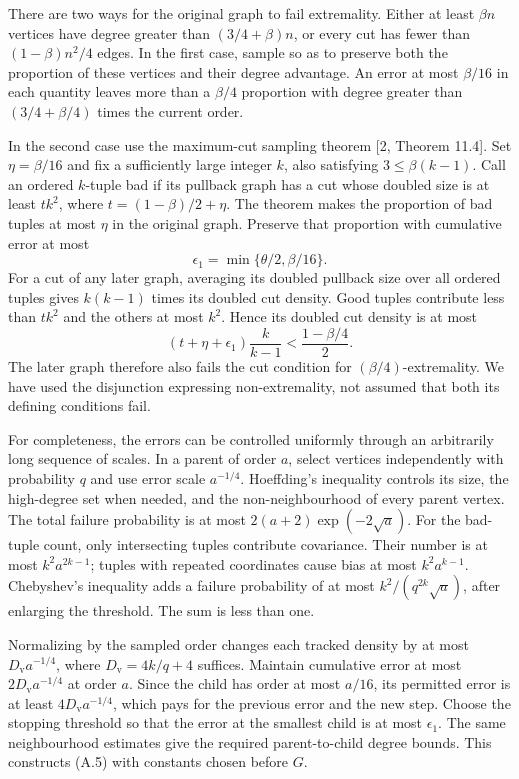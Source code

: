 \documentclass[english,11pt,a4paper]{article}
\begin{document}
There are two ways for the original graph to fail extremality. Either at least \(\beta n\) vertices have degree greater than \((3/4+\beta)n\), or every cut has fewer than \((1-\beta)n^2/4\) edges. In the first case, sample so as to preserve both the proportion of these vertices and their degree advantage. An error at most \(\beta/16\) in each quantity leaves more than a \(\beta/4\) proportion with degree greater than \((3/4+\beta/4)\) times the current order.

In the second case use the maximum-cut sampling theorem {[}2, Theorem 11.4{]}. Set \(\eta=\beta/16\) and fix a sufficiently large integer \(k\), also satisfying \(3\le\beta(k-1)\). Call an ordered \(k\)-tuple bad if its pullback graph has a cut whose doubled size is at least \(t k^2\), where \(t=(1-\beta)/2+\eta\). The theorem makes the proportion of bad tuples at most \(\eta\) in the original graph. Preserve that proportion with cumulative error at most \[\epsilon_1=\min\{\theta/2,\beta/16\}.\] For a cut of any later graph, averaging its doubled pullback size over all ordered tuples gives \(k(k-1)\) times its doubled cut density. Good tuples contribute less than \(t k^2\) and the others at most \(k^2\). Hence its doubled cut density is at most \[(t+\eta+\epsilon_1)\frac{k}{k-1}<\frac{1-\beta/4}{2}.\] The later graph therefore also fails the cut condition for \((\beta/4)\)-extremality. We have used the disjunction expressing non-extremality, not assumed that both its defining conditions fail.

For completeness, the errors can be controlled uniformly through an arbitrarily long sequence of scales. In a parent of order \(a\), select vertices independently with probability \(q\) and use error scale \(a^{-1/4}\). Hoeffding's inequality controls its size, the high-degree set when needed, and the non-neighbourhood of every parent vertex. The total failure probability is at most \(2(a+2)\exp(-2\sqrt a)\). For the bad-tuple count, only intersecting tuples contribute covariance. Their number is at most \(k^2a^{2k-1}\); tuples with repeated coordinates cause bias at most \(k^2a^{k-1}\). Chebyshev's inequality adds a failure probability of at most \(k^2/(q^{2k}\sqrt a)\), after enlarging the threshold. The sum is less than one.

Normalizing by the sampled order changes each tracked density by at most \(D_{\mathrm v}a^{-1/4}\), where \(D_{\mathrm v}=4k/q+4\) suffices. Maintain cumulative error at most \(2D_{\mathrm v}a^{-1/4}\) at order \(a\). Since the child has order at most \(a/16\), its permitted error is at least \(4D_{\mathrm v}a^{-1/4}\), which pays for the previous error and the new step. Choose the stopping threshold so that the error at the smallest child is at most \(\epsilon_1\). The same neighbourhood estimates give the required parent-to-child degree bounds. This constructs (A.5) with constants chosen before \(G\).
\end{document}
